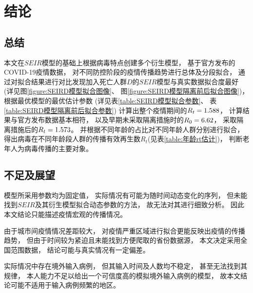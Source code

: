 \section{结论}
\subsection{总结}
\par 本文在$SEIR$模型的基础上根据病毒特点创建多个衍生模型，
基于官方发布的COVID-19疫情数据，
对不同防控阶段的疫情传播趋势进行总体及分段拟合，
通过对拟合结果进行对比发现加入死亡人群$D$的$SEIR$模型与真实数据拟合度最好
(详见图\ref{figure:SEIRD模型拟合图像}、
图\ref{figure:SEIRD模型隔离前后拟合图像})，
根据最优模型的最优估计参数
(详见表\ref{table:SEIRD模型拟合参数}、
表\ref{table:SEIRD模型隔离前后拟合参数})
计算出整个疫情期间的$R_t=1.588$，
计算结果与官方发布数据基本相符，
以及早期未采取隔离措施时的$R_0=6.62$，
采取隔离措施后的$R_t=1.573$。
并根据不同年龄的占比对不同年龄人群分别进行拟合，
得出病毒在不同年龄段人群的传播有效再生数$R_t$(见表\ref{table:年龄rt估计})，
判断老年人为病毒传播的主要对象。
\subsection{不足及展望}
\par 模型所采用参数均为固定值，
实际情况有可能为随时间动态变化的序列，
但未能找到$SEIR$及其衍生模型拟合动态参数的方法，
故无法对其进行细致分析。
因此本文结论只能描述疫情宏观的传播情况。
\par 由于城市间疫情情况差距较大，
对疫情严重区域进行拟合更能反映出疫情的传播趋势，
但由于时间较为紧迫且未能找到方便爬取的省份数据源，
本文决定采用全国范围数据，
结论可能与真实情况有一定偏差。
\par 实际情况中存在境外输入病例，
但其输入时间及人数均不稳定，
甚至无法找到其规律，
本人能力不足以给出一个可信度高的模拟境外输入病例的模型，
故本文结论可能不适用于输入病例频繁的地区。
